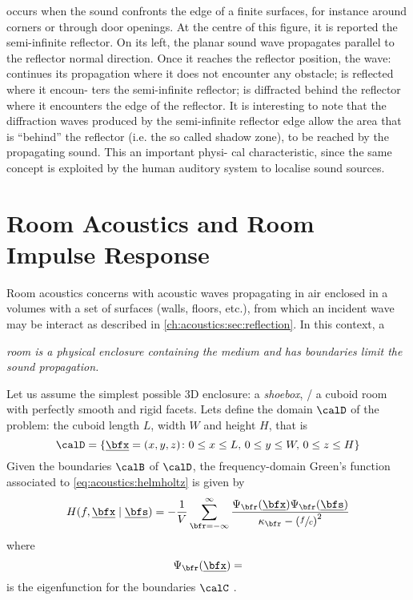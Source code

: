  occurs when the sound confronts the edge of a finite surfaces, for instance around corners or through door openings.
At the centre of this figure, it is reported the semi-infinite reflector. On its left, the planar sound wave propagates parallel to the reflector normal direction. Once it reaches the reflector position, the wave: continues its propagation where it does not encounter any obstacle; is reflected where it encoun- ters the semi-infinite reflector; is diffracted behind the reflector where it encounters the edge of the reflector. It is interesting to note that the diffraction waves produced by the semi-infinite reflector edge allow the area that is “behind” the reflector (i.e. the so called shadow zone), to be reached by the propagating sound. This an important physi- cal characteristic, since the same concept is exploited by the human auditory system to localise sound sources.


\section{Room Acoustics and Room Impulse Response}\label{ch:acoustics:sec:rir}
Room acoustics concerns with acoustic waves propagating in air enclosed in a volumes with a set of surfaces
(walls, floors, etc.), from which an incident wave may be interact as described in \cref{ch:acoustics:sec:reflection}.
In this context, a
\begin{center}
    \textit{\emph{room} is a physical enclosure containing the medium and has boundaries limit the sound propagation.}
\end{center}

Let us assume the simplest possible 3D enclosure: a \textit{shoebox}, \ie/ a cuboid room with perfectly smooth and rigid facets.
Lets define the domain $\calD$ of the problem: the cuboid length $L$, width $W$ and height $H$, that is
\begin{equation}
    \calD = \kset{\positionMicrophone = (x,y,z)}{
        0 \le x \le L,\,
        0 \le y \le W,\,
        0 \le z \le H}
\end{equation}
Given the boundaries $\calB$ of $\calD$, the frequency-domain Green's function associated to \cref{eq:acoustics:helmholtz} is given by
\begin{equation}
    \label{eq:acoustics:greenBounded}
    H(f, \positionMicrophone \mid \positionSource) =
        - \frac{1}{V}
        \sum_{\pos=-\infty}^{\infty}
        \frac{\Psi_{\pos}(\positionMicrophone)\Psi_{\pos}(\positionSource)}{\kappa_{\pos} - \kparen{\sfrac{f}{c}}^2}
\end{equation}
where
\begin{equation}
    \Psi_{\pos}(\positionMicrophone) =
\end{equation}
is the eigenfunction for the boundaries $\calC$ \citeauthor{kuttruff2016room}.

